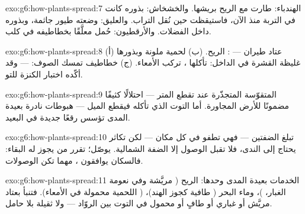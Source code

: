 \begin{solution}{exo:g6:how-plants-spread:7}
الهندباء: طارت مع الريح بريشها. والخشخاش: بذوره كانت في التربة منذ
الآن، فاستيقظت حين نُقل التراب. والعليق: وضعته طيور جاثمة، وبذوره
داخل الفضلات. والأرقطيون: حُمل معلَّقًا بخطاطيفه في  كلب.
\end{solution}

\begin{solution}{exo:g6:how-plants-spread:8}
(أ) عتاد طيران --- : الريح. (ب) لحمية ملونة وبذورها غليظة
القشرة في الداخل: تأكلها ،  تركب الأمعاء. (ج)
خطاطيف تمسك الصوف:   --- وقد أكّده اختبار الكنزة للتو.
\end{solution}

\begin{solution}{exo:g6:how-plants-spread:9}
 المتقوّسة المتجذّرة عند  تقطع المتر --- احتلالًا
كثيفًا مضمونًا للأرض المجاورة. أما التوت الذي تأكله  فيقطع
الميل --- هبوطات نادرة بعيدة المدى تؤسس رقعًا جديدة في البعيد.
\end{solution}

\begin{solution}{exo:g6:how-plants-spread:10}
 تبلغ الضفتين --- فهي تطفو في كل مكان --- لكن تكاثر 
 يحتاج إلى الندى، فلا تقبل الوصول إلا  الضفة الشمالية.
 يوصّل؛  تقرر من يجوز له البقاء: فالسكان يوافقون
، مهما تكن الوصولات.
\end{solution}

\begin{solution}{exo:g6:how-plants-spread:11}
الخدمات بعيدة المدى وحدها: الريح ( مريَّشة وفي نعومة الغبار،
)، وماء البحر ( طافية كجوز الهند)،  ( 
اللحمية محمولة في الأمعاء). فتنبأ بعتاد مريَّش أو غباري أو طافٍ أو
محمول في التوت بين الروّاد --- ولا  ثقيلة بلا حامل.
\end{solution}

